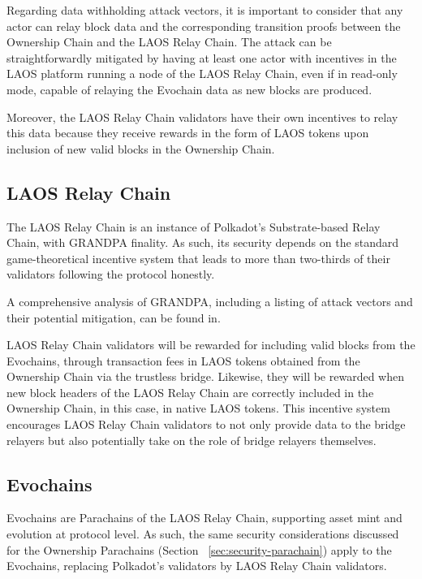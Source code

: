 Regarding data withholding attack vectors,
it is important to consider that any actor can 
relay block data and the corresponding transition proofs
between the Ownership Chain and the LAOS Relay Chain.
The attack can be straightforwardly mitigated by having at least one
actor with incentives in the LAOS platform running a node of the
LAOS Relay Chain, even if in read-only mode, capable of relaying 
the Evochain data as new blocks are produced.

Moreover, the LAOS Relay Chain validators have their own incentives
to relay this data because they receive rewards
in the form of LAOS tokens
upon inclusion of new valid blocks in the Ownership Chain.


\subsection{LAOS Relay Chain}\label{sec:security-laos-relay}
 
The LAOS Relay Chain is an instance of Polkadot's Substrate-based Relay Chain,
with GRANDPA finality.
As such, its security depends
on the standard game-theoretical incentive system that
leads to more than two-thirds of their validators following
the protocol honestly.

A comprehensive analysis of GRANDPA, including a listing of 
attack vectors and their potential mitigation, can be found in\cite{grandpa}.

LAOS Relay Chain validators will be rewarded for including valid blocks
from the Evochains, through transaction fees in LAOS tokens obtained from
the Ownership Chain via the trustless bridge. Likewise, they will be rewarded
when new block headers of the LAOS Relay Chain are correctly included in the Ownership Chain,
in this case, in native LAOS tokens. 
This incentive system encourages LAOS Relay Chain validators
to not only provide data to the bridge relayers
but also potentially take on the role of bridge relayers themselves.

\subsection{Evochains}\label{sec:security-evochains}

Evochains are Parachains of the LAOS Relay Chain,
supporting asset mint and evolution at protocol level.
As such, the same security considerations discussed for the Ownership Parachains
(Section ~\ref{sec:security-parachain}) apply to the Evochains, replacing
Polkadot's validators by LAOS Relay Chain validators.